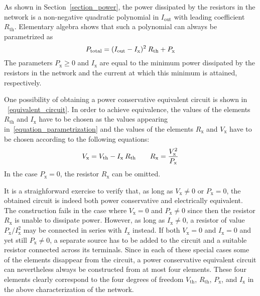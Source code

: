 \documentclass[twoside]{IEEEtran}
\newcommand{\mult}{\nonscript\:}
\newcommand{\opout}{{\operatorname{out}}}
\newcommand{\opth}{{\operatorname{th}}}
\newcommand{\optotal}{{\operatorname{total}}}
\newcommand{\opx}{{\operatorname{x}}}
\begin{document}
As shown in Section~\ref{section_power}, the power dissipated by the resistors in the network is a non-negative quadratic polynomial in $I_{\opout}$ with leading coefficient $R_{\opth}$.
Elementary algebra shows that such a polynomial can always be parametrized as
\begin{equation}
    P_{\optotal}
  = (I_{\opout} - I_{\opx})^{2} \mult R_{\opth} + P_{\opx}
  \label{equation_parametrization}
\end{equation}
The parameters $P_{\opx} \ge 0$ and $I_{\opx}$ are equal to the minimum power dissipated by the resistors in the network and the current at which this minimum is attained, respectively.

One possibility of obtaining a power conservative equivalent circuit is shown in \figurename~\ref{equivalent_circuit}.
In order to achieve equivalence, the values of the elements $R_{\opth}$ and $I_{\opx}$ have to be chosen as the values appearing in~\eqref{equation_parametrization} and the values of the elements $R_{\opx}$ and $V_{\opx}$ have to be chosen according to the following equations:
\begin{displaymath}
    V_{\opx}
  = V_{\opth} - I_{\opx} \mult R_{\opth}
  \qquad
    R_{\opx}
  = \frac{V_{\opx}^{2}}{P_{\opx}}
\end{displaymath}
In the case $P_{\opx} = 0$, the resistor $R_{\opx}$ can be omitted.

It is a straighforward exercise to verify that, as long as $V_{\opx} \ne 0$ or $P_{\opx} = 0$, the obtained circuit is indeed both power conservative and electrically equivalent.
The construction fails in the case where $V_{\opx} = 0$ and $P_{\opx} \ne 0$ since then the resistor $R_{\opx}$ is unable to dissipate power.
However, as long as $I_{\opx} \ne 0$, a resistor of value $P_{\opx} / I_{\opx}^{2}$ may be connected in series with $I_{\opx}$ instead.
If both $V_{\opx} = 0$ and $I_{\opx} = 0$ and yet still $P_{\opx} \ne 0$, a separate source has to be added to the circuit and a suitable resistor connected across its terminals.
Since in each of these special cases some of the elements disappear from the circuit, a power conservative equivalent circuit can nevertheless always be constructed from at most four elements.
These four elements clearly correspond to the four degrees of freedom $V_{\opth}$, $R_{\opth}$, $P_{\opx}$, and $I_{\opx}$ in the above characterization of the network.


\end{document}
